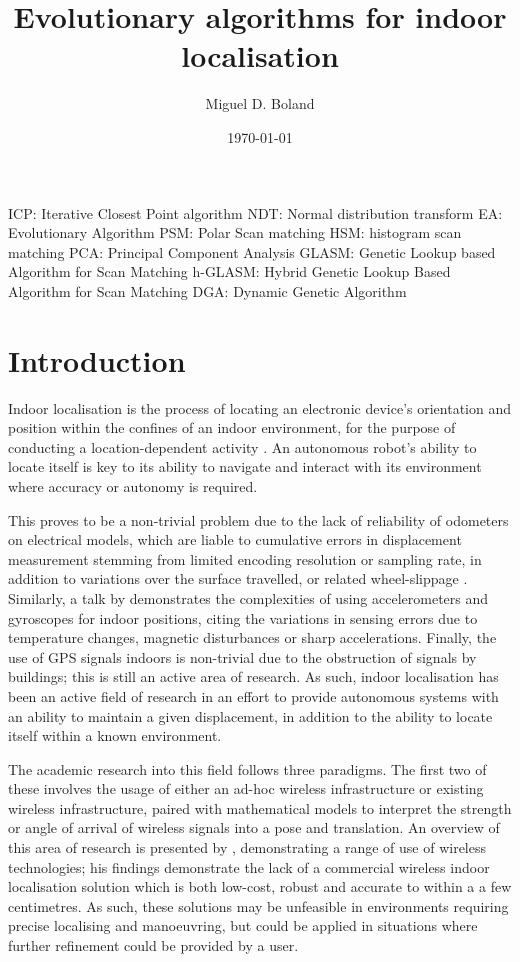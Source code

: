 \documentclass[authoryearcitations]{UoYCSproject}
\author{Miguel D. Boland}
\title{Evolutionary algorithms for indoor localisation}
\date{\today}
\begin{document}
\maketitle
\tableofcontents
\listoffigures
\listoftables
\clearpage
ICP: Iterative Closest Point algorithm
NDT: Normal distribution transform
EA: Evolutionary Algorithm
PSM: Polar Scan matching
HSM: histogram scan matching
PCA: Principal Component Analysis
GLASM: Genetic Lookup based Algorithm for Scan Matching
h-GLASM: Hybrid Genetic Lookup Based Algorithm for Scan Matching
DGA: Dynamic Genetic Algorithm


\chapter{Introduction}
\label{cha:Introduction}
Indoor localisation is the process of locating an electronic device's orientation and position within the confines of an indoor environment, for the purpose of conducting a location-dependent activity \cite{Curran2011-zs}. An autonomous robot's ability to locate itself is key to its ability to navigate and interact with its environment where accuracy or autonomy is required. 

This proves to be a non-trivial problem due to the lack of reliability of odometers on electrical models, which are liable to cumulative errors in displacement measurement stemming from limited encoding resolution or sampling rate, in addition to variations over the surface travelled, or related wheel-slippage \cite{Borenstein1996-al}. Similarly, a talk by \citet{Sachs2010-pw} demonstrates the complexities of using accelerometers and gyroscopes for indoor positions, citing the variations in sensing errors due to temperature changes, magnetic disturbances or sharp accelerations. Finally, the use of GPS signals indoors is non-trivial due to the obstruction of signals by buildings; this is still an active area of research\cite{Gowdayyanadoddi2015-hg}. As such, indoor localisation has been an active field of research in an effort to provide autonomous systems with an ability to maintain a given displacement, in addition to the ability to locate itself within a known environment. 

The academic research into this field follows three paradigms. The first two of these involves the usage of either an ad-hoc wireless infrastructure or existing wireless infrastructure, paired with mathematical models to interpret the strength or angle of arrival of wireless signals into a pose and translation. An overview of this area of research is presented by \citet{Liu2007-in}, demonstrating a range of use of wireless technologies; his findings demonstrate the lack of a commercial wireless indoor localisation solution which is both low-cost, robust and accurate to within a a few centimetres. As such, these solutions may be unfeasible in environments requiring precise localising and manoeuvring, but could be applied in situations where further refinement could be provided by a user. 
\end{document}
